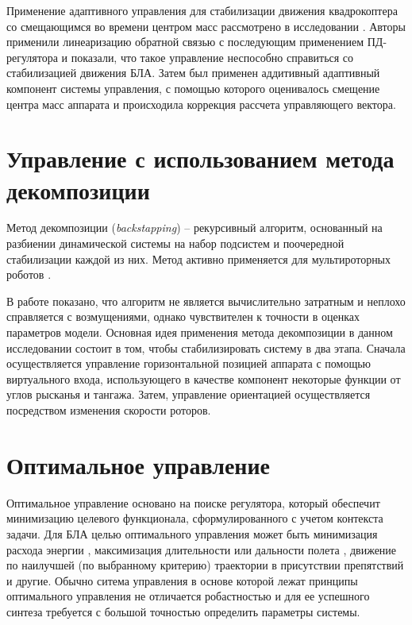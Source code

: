 Применение адаптивного управления для стабилизации движения квадрокоптера со смещающимся во времени центром масс рассмотрено в исследовании \cite{Palunko01}. Авторы применили линеаризацию обратной связью с последующим применением ПД-регулятора и показали, что такое управление неспособно справиться со стабилизацией движения БЛА. Затем был применен аддитивный адаптивный компонент системы управления, с помощью которого оценивалось смещение центра масс аппарата и происходила коррекция рассчета управляющего вектора.

\section{Управление с использованием метода декомпозиции}

Метод декомпозиции (\textit{backstapping}) -- рекурсивный алгоритм, основанный на разбиении динамической системы на набор подсистем и поочередной стабилизации каждой из них. Метод активно применяется для мультироторных роботов \cite{Pota01, Chen01, Jung01, Huo01}.

В работе \cite{Madani01} показано, что алгоритм не является вычислительно затратным и неплохо справляется с возмущениями, однако чувствителен к точности в оценках параметров модели. Основная идея применения метода декомпозиции в данном исследовании состоит в том, чтобы стабилизировать систему в два этапа. Сначала осуществляется управление горизонтальной позицией аппарата с помощью виртуального входа, использующего в качестве компонент некоторые функции от углов рысканья и тангажа. Затем, управление ориентацией осуществляется посредством изменения скорости роторов.

\section{Оптимальное управление}

Оптимальное управление основано на поиске регулятора, который обеспечит минимизацию целевого функционала, сформулированного с учетом контекста задачи.
Для БЛА целью оптимального управления может быть минимизация расхода энергии \cite{Morbidi01, Huang01}, максимизация длительности или дальности полета \cite{Cowling01, Suicmez01}, движение по наилучшей (по выбранному критерию) траектории в присутствии препятствий \cite{Chen02, Cheng01} и другие.
Обычно ситема управления в основе которой лежат принципы оптимального управления не отличается робастностью и для ее успешного синтеза требуется с большой точностью определить параметры системы.

